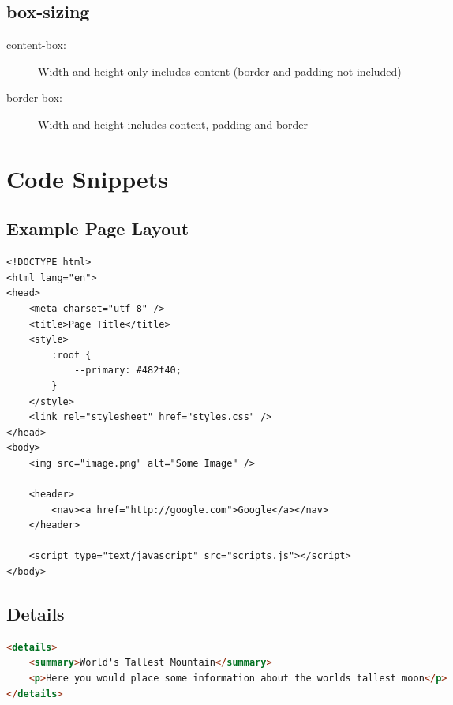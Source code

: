 \documentclass[12pt, a4paper]{article}
\begin{document}
\begin{multicols}{2}
		\subsection{box-sizing}
		\begin{description}
			\item[content-box:] Width and height only includes content (border and padding not included)
 			\item[border-box:] Width and height includes content, padding and border
		\end{description}
		
	\end{multicols}
	
	\newpage
	\section{Code Snippets}
	\subsection{Example Page Layout}
	\begin{lstlisting}
<!DOCTYPE html>
<html lang="en">
<head>
	<meta charset="utf-8" />
	<title>Page Title</title>
	<style>
		:root {
			--primary: #482f40;
		}
	</style>
	<link rel="stylesheet" href="styles.css" />
</head>
<body>
	<img src="image.png" alt="Some Image" />
	
	<header>
		<nav><a href="http://google.com">Google</a></nav>
	</header>

	<script type="text/javascript" src="scripts.js"></script>
</body>	
	\end{lstlisting}
	

	\subsection{Details}
	\begin{lstlisting}[language=html]
<details>
	<summary>World's Tallest Mountain</summary>
	<p>Here you would place some information about the worlds tallest moon</p>
</details>
	\end{lstlisting}
\end{document}
